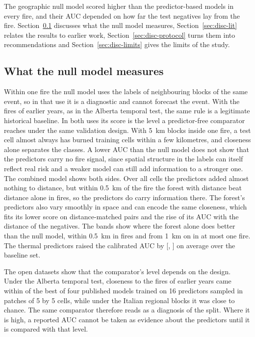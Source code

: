 \documentclass[preprint,12pt,authoryear]{elsarticle}
\begin{document}
The geographic null model scored higher than the predictor-based models in every fire, and their AUC depended on how far the test negatives lay from the fire. Section~\ref{sec:disc-meaning} discusses what the null model measures, Section~\ref{sec:disc-lit} relates the results to earlier work, Section~\ref{sec:disc-protocol} turns them into recommendations and Section~\ref{sec:disc-limits} gives the limits of the study.

\subsection{What the null model measures}
\label{sec:disc-meaning}

Within one fire the null model uses the labels of neighbouring blocks of the same event, so in that use it is a diagnostic and cannot forecast the event. With the fires of earlier years, as in the Alberta temporal test, the same rule is a legitimate historical baseline. In both uses its score is the level a predictor-free comparator reaches under the same validation design. With 5~km blocks inside one fire, a test cell almost always has burned training cells within a few kilometres, and closeness alone separates the classes. A lower AUC than the null model does not show that the predictors carry no fire signal, since spatial structure in the labels can itself reflect real risk and a weaker model can still add information to a stronger one. The combined model shows both sides. Over all cells the predictors added almost nothing to distance, but within 0.5~km of the fire the forest with distance beat distance alone in \vcombNearWins{} fires, so the predictors do carry information there. The forest's predictors also vary smoothly in space and can encode the same closeness, which fits its lower score on distance-matched pairs and the rise of its AUC with the distance of the negatives. The bands show where the forest alone does better than the null model, within 0.5~km in \vbandARfWins{} fires and from 1~km on in at most one fire. The thermal predictors raised the calibrated AUC by \vcaucDiff{} [\vcaucDiffLo, \vcaucDiffHi] on average over the baseline set.

The open datasets show that the comparator's level depends on the design. Under the Alberta temporal test, closeness to the fires of earlier years came within \valDiff{} of the best of four published models trained on 16 predictors sampled in patches of 5 by 5 cells, while under the Italian regional blocks it was close to chance. The same comparator therefore reads as a diagnosis of the split. Where it is high, a reported AUC cannot be taken as evidence about the predictors until it is compared with that level.
\end{document}
